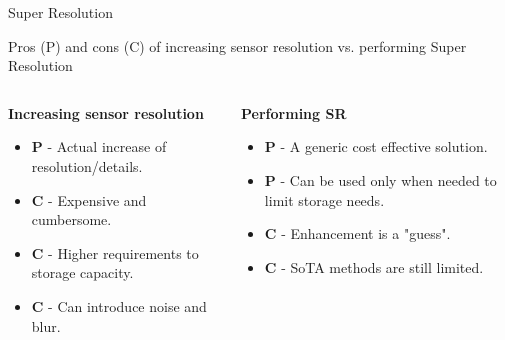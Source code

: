 \begin{frame}{Super Resolution}{}
    \begin{block}{Pros (P) and cons (C) of increasing sensor resolution vs. performing Super Resolution}
        ~\\
        \begin{columns}
            \begin{column}{0.5\textwidth}
                \textbf{Increasing sensor resolution}
                \begin{itemize}
                    \item \textbf{P} - Actual increase of resolution/details.
                    \item \textbf{C} - Expensive and cumbersome.
                    \item \textbf{C} - Higher requirements to storage capacity.
                    \item \textbf{C} - Can introduce noise and blur.
                \end{itemize}
            \end{column}
            \begin{column}{0.5\textwidth}
                \textbf{Performing SR}
                \begin{itemize}
                    \item \textbf{P} - A generic cost effective solution.
                    \item \textbf{P} - Can be used only when needed to limit storage needs.
                    \item \textbf{C} - Enhancement is a "guess".
                    \item \textbf{C} - SoTA methods are still limited.
                \end{itemize}

            \end{column}
        \end{columns}




    \end{block}
\end{frame}




